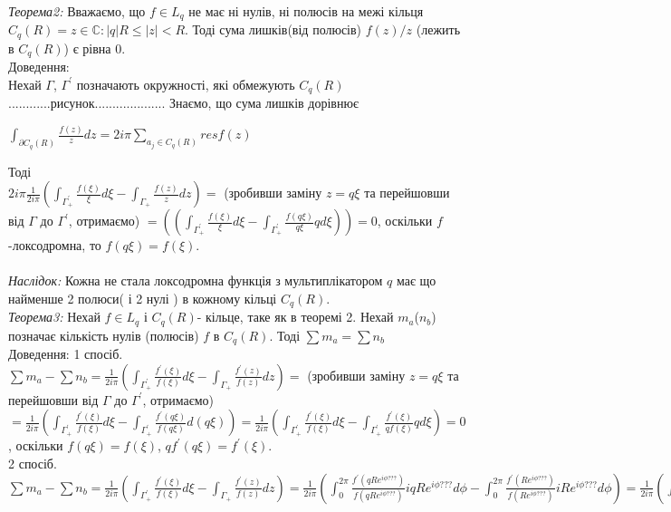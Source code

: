 \documentclass[12pt,a4paper]{article}
\begin{document}
\emph{Теорема2:} Вважаємо, що $f\in L_{q}$ не має ні нулів, ні полюсів на межі кільця $C_{q}(R)={z\in \mathbb{C}:\left |q  \right |R\leq \left |z  \right |<R }$. Тоді сума лишків(від полюсів) $f(z)/z$ (лежить в $C_{q}(R)$) є рівна $0$.\\
Доведення:\\
Нехай $\Gamma$, $\Gamma^{'}$ позначають окружності, які обмежують $C_{q}(R)$............рисунок....................
Знаємо, що сума лишків дорівнює
\begin{center}
$\int_{\partial C_{q}(R)}^{ } \frac{f(z)}{z}dz=2i\pi \sum_{a_{j}\in C_{q}(R)}^{ } resf(z)$
\end{center}
Тоді \\
$2i\pi \frac{1}{2i\pi}(\int_{\Gamma^{'}_{+}}^{ } \frac{f(\xi )}{\xi }d\xi -\int_{\Gamma_{+}}^{ }\frac{f(z)}{z}dz)=$ (зробивши заміну $z=q\xi$  та перейшовши від $\Gamma$ до $\Gamma^{'}$, отримаємо)  $=((\int_{\Gamma^{'}_{+}}^{ } \frac{f(\xi )}{\xi }d\xi -\int_{\Gamma^{'}_{+}}^{ }\frac{f(q\xi)}{q\xi}qd\xi))=0$, оскільки $f$-локсодромна, то $f(q\xi)=f(\xi)$.\\
\\
\emph{Наслідок:} Кожна не стала локсодромна функція з мультиплікатором $q$ має що найменше 2 полюси( і 2 нулі ) в кожному кільці $C_{q}(R)$.\\
  
\emph{Теорема3:} Нехай $f\in L_{q}$ і $C_{q}(R)$- кільце, таке як в теоремі 2. Нехай $m_{a}$($n_{b}$) позначає кількість нулів (полюсів) $f$ в $C_{q}(R)$. Тоді $\sum m_{a}=\sum n_{b}$ \\
Доведення:
1 спосіб.\\
$\sum m_{a}-\sum n_{b} = \frac{1}{2i\pi}(\int_{\Gamma^{'}_{+}}^{ } \frac{f^{'}(\xi )}{f(\xi) }d\xi-\int_{\Gamma_{+}}^{ } \frac{f^{'}(z)}{f(z)}dz)=$ (зробивши заміну $z=q\xi$  та перейшовши від $\Gamma$ до $\Gamma^{'}$, отримаємо) $= \frac{1}{2i\pi}(\int_{\Gamma^{'}_{+}}^{ } \frac{f^{'}(\xi )}{f(\xi) }d\xi - \int_{\Gamma^{'}_{+}}^{ } \frac{f^{'}(q\xi )}{f(q\xi) }d(q\xi)) = \frac{1}{2i\pi}(\int_{\Gamma^{'}_{+}}^{ } \frac{f^{'}(\xi )}{f(\xi) }d\xi - \int_{\Gamma^{'}_{+}}^{ } \frac{f^{'}(\xi )}{qf(\xi) }qd\xi)=0 $, оскільки $ f(q\xi)=f(\xi)$, $qf^{'}(q\xi)=f^{'}(\xi)$.\\
2 спосіб.\\
$\sum m_{a}-\sum n_{b} = \frac{1}{2i\pi}(\int_{\Gamma^{'}_{+}}^{ } \frac{f^{'}(\xi )}{f(\xi) }d\xi-\int_{\Gamma_{+}}^{ } \frac{f^{'}(z)}{f(z)}dz) = \frac{1}{2i\pi}(\int_{0}^{2\pi} \frac{f^{'}(qRe^{i\phi???})}{f(qRe^{i\phi???}) }iqRe^{i\phi???}d\phi - \int_{0}^{2\pi} \frac{f^{'}(Re^{i\phi???})}{f(Re^{i\phi???}) }iRe^{i\phi???}d\phi) = \frac{1}{2i\pi}(\int_{0}^{2\pi} \frac{f^{'}(Re^{i\phi???})}{f(Re^{i\phi???}) }\frac{1}{q} iqRe^{i\phi???}d\phi - \int_{0}^{2\pi} \frac{f^{'}(Re^{i\phi???})}{f(Re^{i\phi???}) }iRe^{i\phi???}d\phi)=0 $\\
\end{document}
